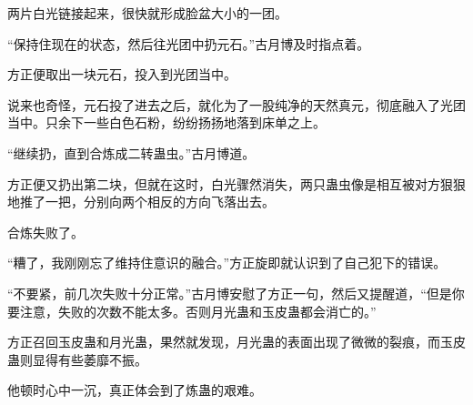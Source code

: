 \begin{this_body}
两片白光链接起来，很快就形成脸盆大小的一团。

“保持住现在的状态，然后往光团中扔元石。”古月博及时指点着。

方正便取出一块元石，投入到光团当中。

说来也奇怪，元石投了进去之后，就化为了一股纯净的天然真元，彻底融入了光团当中。只余下一些白色石粉，纷纷扬扬地落到床单之上。

“继续扔，直到合炼成二转蛊虫。”古月博道。

方正便又扔出第二块，但就在这时，白光骤然消失，两只蛊虫像是相互被对方狠狠地推了一把，分别向两个相反的方向飞落出去。

合炼失败了。

“糟了，我刚刚忘了维持住意识的融合。”方正旋即就认识到了自己犯下的错误。

“不要紧，前几次失败十分正常。”古月博安慰了方正一句，然后又提醒道，“但是你要注意，失败的次数不能太多。否则月光蛊和玉皮蛊都会消亡的。”

方正召回玉皮蛊和月光蛊，果然就发现，月光蛊的表面出现了微微的裂痕，而玉皮蛊则显得有些萎靡不振。

他顿时心中一沉，真正体会到了炼蛊的艰难。

\end{this_body}

